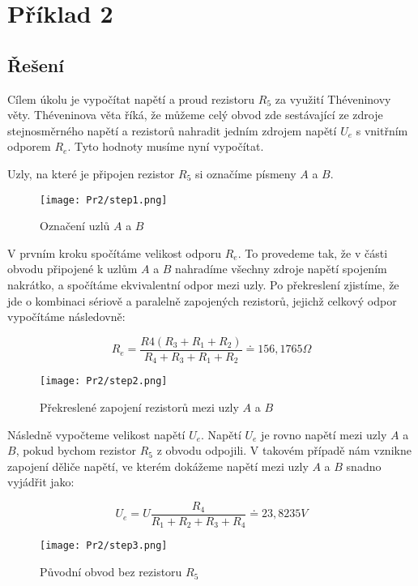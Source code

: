\section{Příklad 2}

\subsection{Řešení}

Cílem úkolu je vypočítat napětí a proud rezistoru $R_5$ za využití Théveninovy věty. Théveninova věta říká, 
že můžeme celý obvod zde sestávající ze zdroje stejnosměrného napětí a rezistorů nahradit jedním zdrojem
napětí $U_e$ s vnitřním odporem $R_e$. Tyto hodnoty musíme nyní vypočítat. 

Uzly, na které je připojen rezistor $R_5$ si označíme písmeny $A$ a $B$.

\begin{figure}[H]
\texttt{[image: Pr2/step1.png]}
\centering
\caption{Označení uzlů $A$ a $B$}
\end{figure}

V prvním kroku spočítáme velikost odporu $R_e$. To provedeme tak, že v části obvodu připojené k uzlům $A$ a $B$ nahradíme všechny zdroje napětí spojením nakrátko, a spočítáme ekvivalentní odpor mezi uzly. Po překreslení zjistíme, že jde o kombinaci sériově a paralelně zapojených rezistorů, jejichž celkový odpor vypočítáme následovně:

$$ R_e = \frac{R4(R_3 + R_1 + R_2)}{R_4 + R_3 + R_1 + R_2} \doteq 156,1765 \Omega $$

\begin{figure}[H]
\texttt{[image: Pr2/step2.png]}
\centering
\caption{Překreslené zapojení rezistorů mezi uzly $A$ a $B$}
\end{figure}

Následně vypočteme velikost napětí $U_e$. Napětí $U_e$ je rovno napětí mezi uzly $A$ a $B$, pokud bychom rezistor $R_5$ z obvodu odpojili. V takovém případě nám vznikne zapojení děliče napětí, ve kterém dokážeme napětí mezi uzly $A$ a $B$ snadno vyjádřit jako:

$$ U_e = U \frac{R_4}{R_1 + R_2 + R_3 + R_4} \doteq 23,8235 V $$ 

\begin{figure}[H]
\texttt{[image: Pr2/step3.png]}
\centering
\caption{Původní obvod bez rezistoru $R_5$}
\end{figure}


